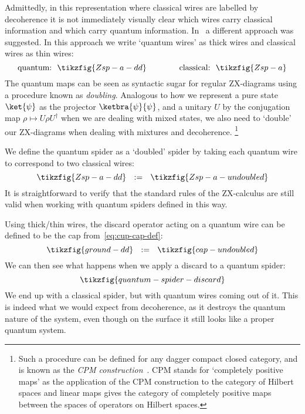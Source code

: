 \documentclass[a4paper,onecolumn,superscriptaddress,11pt,%
				unpublished,%
				allowfontchageintitle,%
				]{quantumarticle}
\begin{document}
Admittedly, in this representation where classical wires are labelled by decoherence it is not immediately visually clear which wires carry classical information and which carry quantum information. In~\cite{coecke_paquette_pavlovic_2009,coecke2016categorical,CKbook} a different approach was suggested.
In this approach we write `quantum wires' as thick wires and classical wires as thin wires:
\begin{equation}
	\text{quantum:} \ \  \tikzfig{Zsp-a-dd} \qquad \qquad \text{classical:} \ \ \tikzfig{Zsp-a}
\end{equation}
The quantum maps can be seen as syntactic sugar for regular ZX-diagrams using a procedure known as \emph{doubling}. 
Analogous to how we represent a pure state $\ket{\psi}$ as the projector $\ketbra{\psi}{\psi}$, and a unitary $U$ by the conjugation map $\rho\mapsto U\rho U^\dagger$ when we are dealing with mixed states, we also need to `double' our ZX-diagrams when dealing with mixtures and decoherence.%
\footnote{Such a procedure can be defined for any dagger compact closed category, and is known as the \emph{CPM construction}~\cite{selinger2007dagger,coecke2010environment}. CPM stands for `completely positive maps' as the application of the CPM construction to the category of Hilbert spaces and linear maps gives the category of completely positive maps between the spaces of operators on Hilbert spaces.}

We define the quantum spider as a `doubled' spider by taking each quantum wire to correspond to two classical wires:
\begin{equation}
	\tikzfig{Zsp-a-dd} \ \ := \ \ \tikzfig{Zsp-a-undoubled}
\end{equation}
It is straightforward to verify that the standard rules of the ZX-calculus are still valid when working with quantum spiders defined in this way.

Using thick/thin wires, the discard operator acting on a quantum wire can be defined to be the cap from~\eqref{eq:cup-cap-def}:
\begin{equation}
	\tikzfig{ground-dd} \ \ := \ \ \tikzfig{cap-undoubled}
\end{equation}
We can then see what happens when we apply a discard to a quantum spider:
\begin{equation}
	\tikzfig{quantum-spider-discard}
\end{equation}
We end up with a classical spider, but with quantum wires coming out of it. This is indeed what we would expect from decoherence, as it destroys the quantum nature of the system, even though on the surface it still looks like a proper quantum system.
\end{document}
